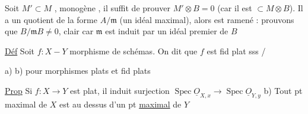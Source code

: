  Soit $M'\subset M$ , monogène  , il suffit de prouver $M'\otimes B=0$ (car il est $\subset M\otimes B$). Il a un quotient de la forme $A/\mathfrak m$ (un idéal maximal), alors   est ramené : prouvons que $B/\mathfrak mB\ne0$, clair car $\mathfrak m$ est induit par un idéal premier de $B$

\uline{Déf} Soit $f:X\mathrel{-}Y$ morphisme de   schémas.  On dit que  $f$ est fid plat sss \quad /

a) b) pour morphismes plats et fid plats

\uline{Prop} Si $f:X\longrightarrow Y$ est plat,  il induit   surjection $\operatorname{Spec}\underline O_{X,x}\longrightarrow\operatorname{Spec}\underline O_{Y,y}$ \quad b) Tout pt maximal de $X$ est au dessus d'un pt \uline{maximal} de $Y$


